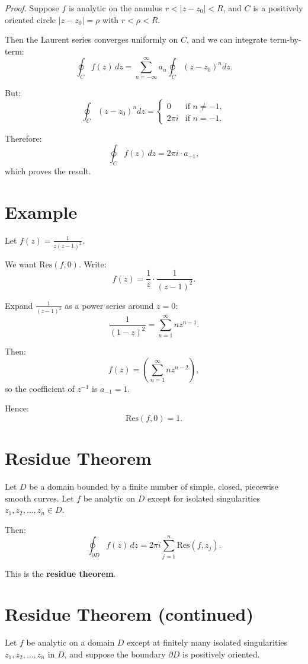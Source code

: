 \documentclass[12pt]{article}
\theoremstyle{definition} %
\theoremstyle{plain} %
\begin{document}
\textit{Proof.} Suppose $f$ is analytic on the annulus $r < |z - z_0| < R$, and $C$ is a positively oriented circle $|z - z_0| = \rho$ with $r < \rho < R$.

Then the Laurent series converges uniformly on $C$, and we can integrate term-by-term:
\[
\oint_C f(z)\,dz = \sum_{n=-\infty}^\infty a_n \oint_C (z - z_0)^n dz.
\]

But:
\[
\oint_C (z - z_0)^n dz =
\begin{cases}
0 & \text{if } n \neq -1, \\
2\pi i & \text{if } n = -1.
\end{cases}
\]

Therefore:
\[
\oint_C f(z) \, dz = 2\pi i \cdot a_{-1},
\]
which proves the result.

\section*{Example}

Let $f(z) = \frac{1}{z(z - 1)^2}$.

We want $\text{Res}(f, 0)$. Write:
\[
f(z) = \frac{1}{z} \cdot \frac{1}{(z - 1)^2}.
\]

Expand $\frac{1}{(z - 1)^2}$ as a power series around $z = 0$:
\[
\frac{1}{(1 - z)^2} = \sum_{n=1}^\infty n z^{n-1}.
\]

Then:
\[
f(z) = \left( \sum_{n=1}^\infty n z^{n - 2} \right),
\]
so the coefficient of $z^{-1}$ is $a_{-1} = 1$.

Hence:
\[
\text{Res}(f, 0) = 1.
\]

\section*{Residue Theorem}

Let $D$ be a domain bounded by a finite number of simple, closed, piecewise smooth curves. Let $f$ be analytic on $D$ except for isolated singularities $z_1, z_2, \dots, z_n \in D$.

Then:
\[
\oint_{\partial D} f(z)\,dz = 2\pi i \sum_{j=1}^n \text{Res}(f, z_j).
\]

This is the \textbf{residue theorem}.
\section*{Residue Theorem (continued)}

Let $f$ be analytic on a domain $D$ except at finitely many isolated singularities $z_1, z_2, \dots, z_n$ in $D$, and suppose the boundary $\partial D$ is positively oriented.
\end{document}
